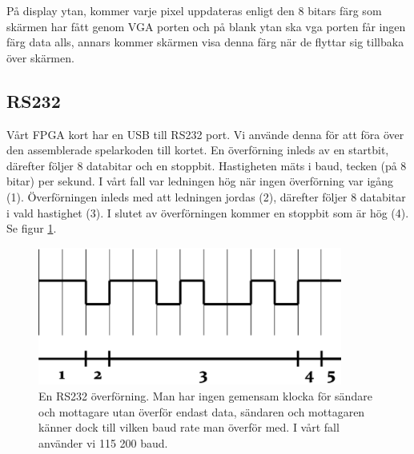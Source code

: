 \documentclass[11pt]{article}
\begin{document}
På display ytan, kommer varje pixel uppdateras enligt den 8 bitars färg som skärmen har fått genom VGA porten och på blank ytan ska vga porten får ingen färg data alls, annars kommer skärmen visa denna färg när de flyttar sig tillbaka över skärmen.

\subsection{RS232}

Vårt FPGA kort har en USB till RS232 port. Vi använde denna för att föra över den assemblerade spelarkoden till kortet. En överförning inleds av en startbit, därefter följer 8 databitar och en stoppbit. Hastigheten mäts i baud, tecken (på 8 bitar) per sekund. I vårt fall var ledningen hög när ingen överförning var igång (1). Överförningen inleds med att ledningen jordas (2), därefter följer 8 databitar i vald hastighet (3). I slutet av överförningen kommer en stoppbit som är hög (4). Se figur \ref{fig:rs232}.

\begin{figure}[h]
    \begin{center}
        \includegraphics[width=10cm]{rs232.eps}
        \caption{En RS232 överförning. Man har ingen gemensam klocka för sändare och mottagare utan överför endast data, sändaren och mottagaren känner dock till vilken baud rate man överför med. I vårt fall använder vi 115 200 baud.}
        \label{fig:rs232}
    \end{center}
\end{figure}
\end{document}
